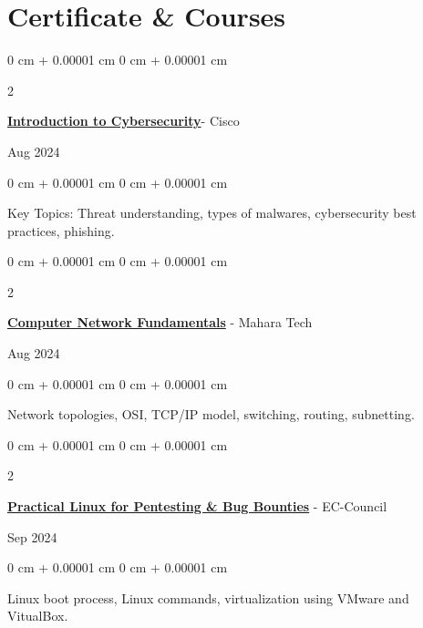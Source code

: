 \documentclass[10pt, letterpaper]{article}
\newenvironment{onecolentry}{
    \begin{adjustwidth}{
        0 cm + 0.00001 cm
    }{
        0 cm + 0.00001 cm
    }
}{
    \end{adjustwidth}
} %
\newenvironment{twocolentry}[2][]{
    \onecolentry
    \def\secondColumn{#2}
    \setcolumnwidth{\fill, 4.5 cm}
    \begin{paracol}{2}
}{
    \switchcolumn \raggedleft \secondColumn
    \end{paracol}
    \endonecolentry
} %
\begin{document}
    
    \section{Certificate \& Courses}

        \begin{samepage}
            \begin{twocolentry}{
                Aug 2024
            }
                \textbf{\href{https://www.credly.com/badges/bea8b461-d5fa-4924-985d-bcb76c48a5e4/linked_in_profile}{Introduction to Cybersecurity}}- Cisco
            \end{twocolentry} 
            

            \vspace{0.10 cm}
            
            \begin{onecolentry}
                Key Topics: Threat understanding, types of malwares, cybersecurity best practices, phishing.
                \vspace{0.10 cm}
        \end{onecolentry}

        \vspace{0.4 em}

        \begin{twocolentry}{
                Aug 2024
            }
                \textbf{\href{https://maharatech.gov.eg/mod/customcert/verify_certificate.php?contextid=1712&code=lletYUfz7L}{Computer Network Fundamentals}} - Mahara Tech
            \end{twocolentry} 
            

            \vspace{0.10 cm}
            
            \begin{onecolentry}
                Network topologies, OSI, TCP/IP model, switching, routing, subnetting.
                \vspace{0.10 cm}
        \end{onecolentry}

               \vspace{0.4 em}

        \begin{twocolentry}{
                Sep 2024
            }
                \textbf{\href{https://codered.eccouncil.org/certificate/7fa0609b-e40b-400a-8987-ec606588fcd4}{Practical Linux for Pentesting \& Bug Bounties}} - EC-Council
            \end{twocolentry} 
            

            \vspace{0.10 cm}
            
            \begin{onecolentry}
                Linux boot process, Linux commands, virtualization using VMware and VitualBox.
                \vspace{0.10 cm}
        \end{onecolentry}
        \end{samepage}
\end{document}
